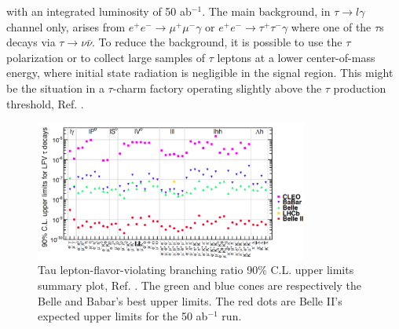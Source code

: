with an integrated luminosity of 50 ab$^{-1}$. The main background, in $\tau \rightarrow l \gamma$ channel only, arises from
$e^+ e^- \rightarrow \mu^+ \mu^- \gamma$ or $e^+ e^- \rightarrow \tau^+ \tau^- \gamma$ where one of the $\tau$s decays via $\tau \rightarrow \nu \bar{\nu}$.
To reduce the background, it is possible to use the $\tau$ polarization or to collect large samples of
$\tau$ leptons at a lower center-of-mass energy, where initial state radiation is negligible in the signal region. This might be the situation in a $\tau$-charm 
factory operating slightly above the $\tau$ production threshold, Ref. \cite{Bennett_2016}.
\begin{figure}[!h]
\centering
\includegraphics[width =0.8\textwidth]{figures/png/Screenshot_20240319_134052.png}
\caption{Tau lepton-flavor-violating branching ratio 90\% C.L. upper limits summary plot, Ref. \cite{universe4100101}. The green and blue cones 
are respectively the Belle and Babar's best upper limits. The red dots are Belle II's expected upper limits for the 50 ab$^{-1}$ run.}
\label{fig:tauchannel}
\end{figure}

